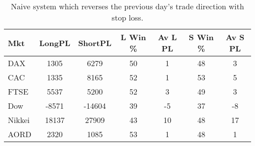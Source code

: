 \begin{table}[ht]
\centering
\caption[Naive Following System.]{Naive system which reverses the previous day's trade direction with stop loss.} 
\label{tab:n_rev_results_sl}
\begin{tabular}{lcccccc}
  \toprule Mkt & LongPL & ShortPL & L Win \% & Av L PL & S Win \% & Av S PL \\ 
  \midrule DAX & 1305 & 6279 & 50 & 1 & 48 & 3 \\ 
  CAC & 1335 & 8165 & 52 & 1 & 53 & 5 \\ 
  FTSE & 5537 & 5200 & 52 & 3 & 49 & 3 \\ 
  Dow & -8571 & -14604 & 39 & -5 & 37 & -8 \\ 
  Nikkei & 18137 & 27909 & 43 & 10 & 48 & 17 \\ 
  AORD & 2320 & 1085 & 53 & 1 & 48 & 1 \\ 
   \bottomrule \end{tabular}
\end{table}
